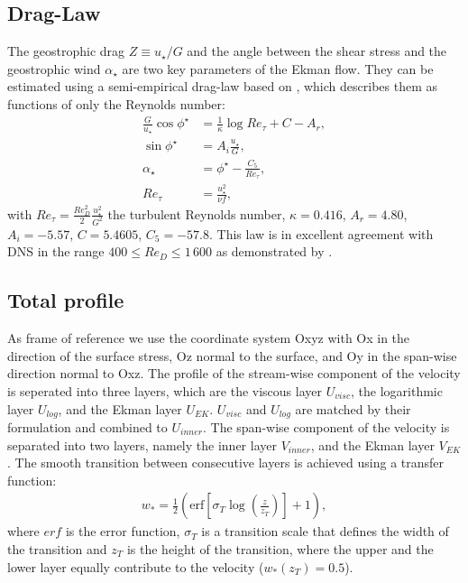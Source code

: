 \documentclass[a4paper,11pt]{article}
\begin{document}
\subsection{Drag-Law}

The geostrophic drag $Z \equiv u_\star/G$ and the angle between the shear stress and the geostrophic wind $\alpha_\star$ are two key parameters of the Ekman flow. They can be estimated using a semi-empirical drag-law based on \cite{spalart1989theoretical}, which describes them as functions of only the Reynolds number:
\begin{subequations}\label{drag}
	\begin{align}
		\frac{G}{u_\star}\cos\phi^\star &= \frac{1}{\kappa}\log Re_\tau + C - A_r, \\
		\sin\phi^\star &= A_i\frac{u_\star}{G},\\
		\alpha_\star &= \phi^\star - \frac{C_5}{Re_\tau},\\
		Re_\tau &= \frac{u_\star^2}{\nu f},
	\end{align}
\end{subequations}
with $Re_\tau = \frac{Re_D^2}{2}\frac{u_\star^2}{G^2}$ the turbulent Reynolds number, $\kappa = 0.416$, $A_r = 4.80$, $A_i = -5.57$, $C = 5.4605$, $C_5 = -57.8$. This law is in excellent agreement with DNS in the range $400\leq Re_D\leq 1\,600$ as demonstrated by \cite{ansorge2014global}.

\subsection{Total profile}

As frame of reference we use the coordinate system Oxyz with Ox in the direction of the surface stress, Oz normal to the surface, and Oy in the span-wise direction normal to Oxz. The profile of the stream-wise component of the velocity is seperated into three layers, which are the viscous layer $U_{visc}$, the logarithmic layer $U_{log}$, and the Ekman layer $U_{EK}$. $U_{visc}$ and $U_{log}$ are matched by their formulation and combined to $U_{inner}$. The span-wise component of the velocity is separated into two layers, namely the inner layer $V_{inner}$, and the Ekman layer $V_{EK}$. The smooth transition between consecutive layers is achieved using a transfer function:
\begin{align}\label{error}
  w_{*} = \frac{1}{2}\left(\textrm{erf}\left[\sigma_T\log\left(\frac{z}{z_{T}}\right)\right]+1\right),
\end{align}
where $erf$ is the error function, $\sigma_T$ is a transition scale that defines the width of the transition and $z_{T}$ is the height of the transition, where the upper and the lower layer equally contribute to the velocity ($w_{*}(z_{T})=0.5$).
\end{document}
